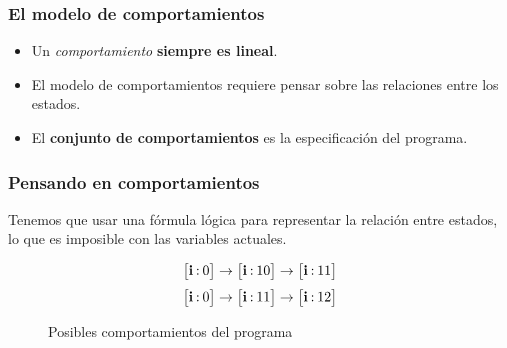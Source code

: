 \documentclass{beamer}
\begin{document}
\begin{frame}
  \frametitle{El modelo de comportamientos}

  \begin{itemize}
    \item Un \emph{comportamiento} \textbf{siempre es lineal}.
    \item El modelo de comportamientos requiere pensar sobre las relaciones entre los
          estados.
    \item El \textbf{conjunto de comportamientos} es la especificación del programa.
  \end{itemize}
\end{frame}

\begin{frame}[fragile]
  \frametitle{Pensando en comportamientos}

  Tenemos que usar una fórmula lógica para representar la relación entre
  estados, lo que es imposible con las variables actuales.

  \begin{figure}
    \begin{center}
      \begin{equation*}
        \begingroup
        \setlength\arraycolsep{1pt}
        \begin{aligned}
          \begin{bmatrix*}
            \textbf{i} &:& 0
          \end{bmatrix*}
          \rightarrow
          \begin{bmatrix*}
            \textbf{i} &:& 10
          \end{bmatrix*}
          \rightarrow
          \begin{bmatrix*}
            \textbf{i} &:& 11
          \end{bmatrix*}
        \end{aligned}
        \endgroup
      \end{equation*}
      \begin{equation*}
        \begingroup
        \setlength\arraycolsep{1pt}
        \begin{aligned}
          \begin{bmatrix*}
            \textbf{i} &:& 0
          \end{bmatrix*}
          \rightarrow
          \begin{bmatrix*}
            \textbf{i} &:& 11
          \end{bmatrix*}
          \rightarrow
          \begin{bmatrix*}
            \textbf{i} &:& 12
          \end{bmatrix*}
        \end{aligned}
        \endgroup
      \end{equation*}
    \end{center}

    \caption{Posibles comportamientos del programa}
    \label{lst:cprogram_behavior}
  \end{figure}

\end{frame}
\end{document}
